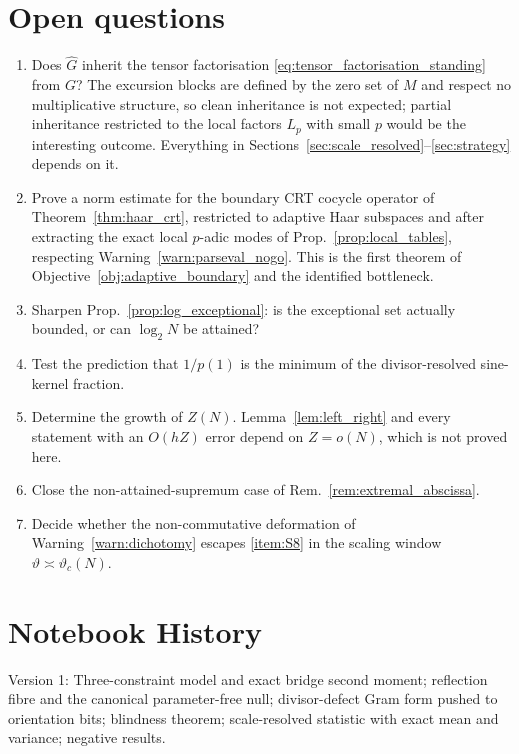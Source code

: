 \documentclass[11pt]{amsart}
\numberwithin{equation}{section}
\theoremstyle{plain}
\theoremstyle{definition}
\theoremstyle{remark}
\begin{document}
\section{Open questions}
\label{sec:open_questions}

\begin{enumerate}[label=(Q\arabic*)]
\item \label{item:Q1}
Does $\widehat G$ inherit the tensor factorisation
\eqref{eq:tensor_factorisation_standing} from $G$? The excursion blocks
are defined by the zero set of $M$ and respect no multiplicative
structure, so clean inheritance is not expected; partial inheritance
restricted to the local factors $L_p$ with small $p$ would be the
interesting outcome. Everything in
Sections~\ref{sec:scale_resolved}--\ref{sec:strategy} depends on it.
\item Prove a norm estimate for the boundary CRT cocycle operator of
Theorem~\ref{thm:haar_crt}, restricted to adaptive Haar subspaces and
after extracting the exact local $p$-adic modes of
Prop.~\ref{prop:local_tables}, respecting
Warning~\ref{warn:parseval_nogo}. This is the first theorem of
Objective~\ref{obj:adaptive_boundary} and the identified bottleneck.
\item Sharpen Prop.~\ref{prop:log_exceptional}: is the exceptional set
actually bounded, or can $\log_2N$ be attained?
\item Test the prediction that $1/p(1)$ is the minimum of the
divisor-resolved sine-kernel fraction.
\item \label{item:Q5}
Determine the growth of $Z(N)$. Lemma~\ref{lem:left_right} and every
statement with an $O(hZ)$ error depend on $Z=o(N)$, which is not proved
here.
\item Close the non-attained-supremum case of
Rem.~\ref{rem:extremal_abscissa}.
\item Decide whether the non-commutative deformation of
Warning~\ref{warn:dichotomy} escapes \ref{item:S8} in the scaling window
$\vartheta\asymp\vartheta_c(N)$.
\end{enumerate}

\section*{Notebook History}
\label{sec:notebook_history}

Version 1:
Three-constraint model and exact bridge second moment; reflection fibre
and the canonical parameter-free null; divisor-defect Gram form pushed
to orientation bits; blindness theorem; scale-resolved statistic with
exact mean and variance; negative results.
\end{document}
